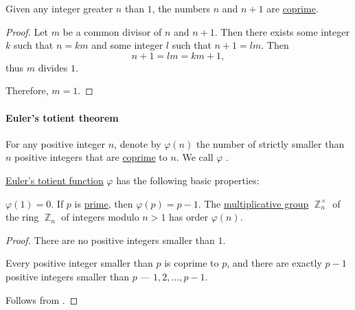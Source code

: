 \begin{proposition}\label{thm:n_plus_1_coprime}
  Given any integer greater \( n \) than \( 1 \), the numbers \( n \) and \( n + 1 \) are \hyperref[def:coprime_elements]{coprime}.
\end{proposition}
\begin{proof}
  Let \( m \) be a common divisor of \( n \) and \( n + 1 \). Then there exists some integer \( k \) such that \( n = km \) and some integer \( l \) such that \( n + 1 = lm \). Then
  \begin{equation*}
    n + 1 = lm = km + 1,
  \end{equation*}
  thus \( m \) divides \( 1 \).

  Therefore, \( m = 1 \).
\end{proof}

\paragraph{Euler's totient theorem}

\begin{definition}\label{def:eulers_totient_function}
  For any positive integer \( n \), denote by \( \varphi(n) \) the number of strictly smaller than \( n \) positive integers that are \hyperref[def:coprime_elements]{coprime} to \( n \). We call \( \varphi \) .
\end{definition}

\begin{proposition}\label{thm:def:eulers_totient_function}
  \hyperref[def:eulers_totient_function]{Euler's totient function} \( \varphi \) has the following basic properties:
  \begin{thmenum}
     \( \varphi(1) = 0 \).
     If \( p \) is \hyperref[def:prime_number]{prime}, then \( \varphi(p) = p - 1 \).
     The \hyperref[def:semiring]{multiplicative group} \( \BbbZ_n^\times \) of the ring \hyperref[def:ring_of_integers_modulo]{\( \BbbZ_n \)} of integers modulo \( n > 1 \) has order \( \varphi(n) \).
  \end{thmenum}
\end{proposition}
\begin{proof}
   There are no positive integers smaller than \( 1 \).

   Every positive integer smaller than \( p \) is coprime to \( p \), and there are exactly \( p - 1 \) positive integers smaller than \( p \) --- \( 1, 2, \ldots, p - 1 \).

   Follows from .
\end{proof}

